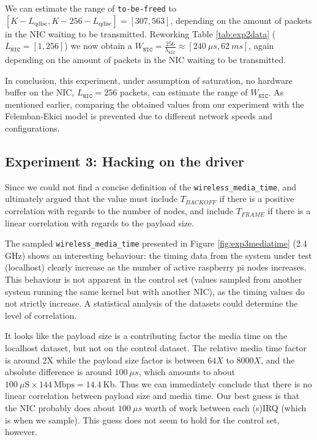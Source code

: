 We can estimate the range of \texttt{to-be-freed} to $[K - L_\text{qdisc}, K -
256 - L_\text{qdisc}] = [307, 563]$, depending on the amount of packets in the
NIC waiting to be transmitted. Reworking Table \ref{tab:exp2data}
($L_\texttt{NIC} = [1, 256]$) we now obtain a $W_\texttt{NIC} =
\frac{256}{\lambda_\texttt{NIC}} \approx [240~\mu s, 62~ms]$, again depending
on the amount of packets in the NIC waiting to be transmitted.

In conclusion, this experiment, under assumption of saturation, no hardware
buffer on the NIC, $L_\texttt{NIC} = 256$ packets, can estimate the range of 
$W_\texttt{NIC}$. As mentioned earlier, comparing the obtained
values from our experiment with the Felemban-Ekici model is prevented due to
different network speeds and configurations.

\subsection{Experiment 3: Hacking on the driver}

Since we could not find a concise definition of the
\texttt{wireless\_media\_time}, and ultimately argued that the value must include $T_{BACKOFF}$ if there is a positive correlation with regards to the number
of nodes, and include $T_{FRAME}$ if there is a linear correlation with regards to the payload size.

The sampled \texttt{wireless\_media\_time} presented in Figure \ref{fig:exp3mediatime} (2.4 GHz) shows an interesting behaviour: the timing data from the system under test (localhost) clearly increase as the number
of active raspberry pi nodes increases. This behaviour is not apparent in the control set (values sampled from another system running
the same kernel but with another NIC), as the timing values do not strictly
increase. A statistical analysis of the datasets could determine the level of correlation.

It looks like the payload size is a contributing factor the
media time on the localhost dataset, but not on the control dataset. The relative
media time factor is around 2X while the payload size factor is between $64X$ to $8000X$, and the absolute difference is around $100~\mu s$, which amounts to about
$100~\text{$\mu$S} \times 144~\text{Mbps} = 14.4~\text{Kb}$. Thus we can immediately conclude that there is no linear correlation between payload size and
media time. Our best guess is that the NIC probably does about $100~\mu s$ worth
of work between each (s)IRQ (which is when we sample). This guess does not seem
to hold for the control set, however.

